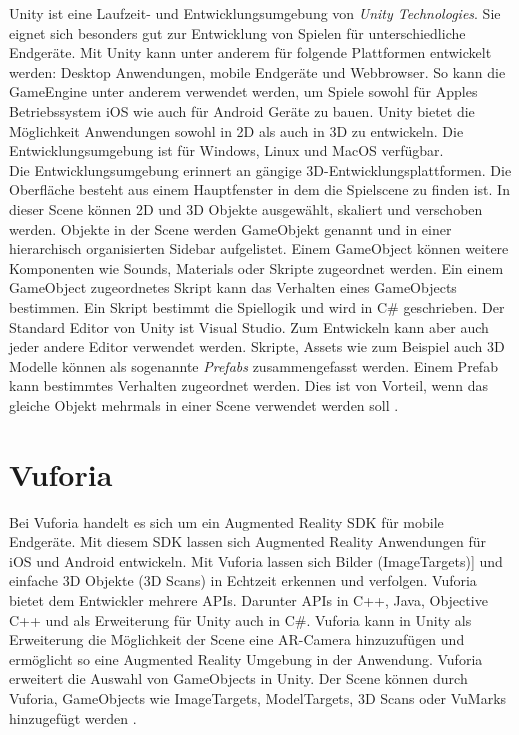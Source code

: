 Unity ist eine Laufzeit- und Entwicklungsumgebung von \textit{Unity Technologies}. Sie eignet sich besonders gut zur Entwicklung von Spielen für unterschiedliche Endgeräte. Mit Unity kann unter anderem für folgende Plattformen entwickelt werden: Desktop Anwendungen, mobile Endgeräte und Webbrowser. So kann die GameEngine unter anderem verwendet werden, um Spiele sowohl für Apples Betriebssystem iOS wie auch für Android Geräte zu bauen. Unity bietet die Möglichkeit Anwendungen sowohl in 2D als auch in 3D zu entwickeln. Die Entwicklungsumgebung ist für Windows, Linux und MacOS verfügbar. \\
Die Entwicklungsumgebung erinnert an gängige 3D-Entwicklungsplattformen. Die Oberfläche besteht aus einem Hauptfenster in dem die Spielscene zu finden ist. In dieser Scene können 2D und 3D Objekte ausgewählt, skaliert und verschoben werden. Objekte in der Scene werden GameObjekt genannt und in einer hierarchisch organisierten Sidebar aufgelistet. Einem GameObject können weitere Komponenten wie Sounds, Materials oder Skripte zugeordnet werden. Ein einem GameObject zugeordnetes Skript kann das Verhalten eines GameObjects bestimmen. Ein Skript bestimmt die Spiellogik und wird in C\# geschrieben. Der Standard Editor von Unity ist Visual Studio. Zum Entwickeln kann aber auch jeder andere Editor verwendet werden. Skripte, Assets wie zum Beispiel auch 3D Modelle können als sogenannte \textit{Prefabs} zusammengefasst werden. Einem Prefab kann bestimmtes Verhalten zugeordnet werden. Dies ist von Vorteil, wenn das gleiche Objekt mehrmals in einer Scene verwendet werden soll \cite{UnityGameEngine}.

\section{Vuforia}
Bei Vuforia handelt es sich um ein Augmented Reality SDK für mobile Endgeräte. Mit diesem SDK lassen sich Augmented Reality Anwendungen für iOS und Android entwickeln. Mit Vuforia lassen sich Bilder (ImageTargets)] und einfache 3D Objekte (3D Scans) in Echtzeit erkennen und verfolgen. Vuforia bietet dem Entwickler mehrere APIs. Darunter APIs in C++, Java, Objective C++ und als Erweiterung für Unity auch in C\#. Vuforia kann in Unity als Erweiterung die Möglichkeit der Scene eine AR-Camera hinzuzufügen und ermöglicht so eine Augmented Reality Umgebung in der Anwendung. Vuforia erweitert die Auswahl von GameObjects in Unity. Der Scene können durch Vuforia, GameObjects wie ImageTargets, ModelTargets, 3D Scans oder VuMarks hinzugefügt werden \cite{VuforiaEngine}.

